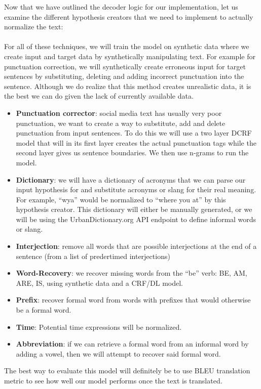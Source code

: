 \documentclass{article}
\begin{document}
Now that we have outlined the decoder logic for our implementation, let us examine the different hypothesis creators that we need to implement to actually normalize the text: \\\\
For all of these techniques, we will train the model on synthetic data where we create input and target data by synthetically manipulating text. For example for punctuation correction, we will synthetically create erroneous input for target sentences by substituting, deleting and adding incorrect punctuation into the sentence. Although we do realize that this method creates unrealistic data, it is the best we can do given the lack of currently available data.
\begin{itemize}
	\item \textbf{Punctuation corrector}: social media text has usually very poor punctuation, we want to create a way to substitute, add and delete punctuation from input sentences. To do this we will use a two layer DCRF model that will in its first layer creates the actual punctuation tags while the second layer gives us sentence boundaries. We then use n-grams to run the model.
	\item \textbf{Dictionary}: we will have a dictionary of acronyms that we can parse our input hypothesis for and substitute acronyms or slang for their real meaning. For example, “wya” would be normalized to “where you at” by this hypothesis creator. This dictionary will either be manually generated, or we will be using the UrbanDictionary.org API endpoint to define informal words or slang.
	\item \textbf{Interjection}: remove all words that are possible interjections at the end of a sentence (from a  list of predertimed interjections)
	\item \textbf{Word-Recovery}: we recover missing words from the “be” verb: BE, AM, ARE, IS, using synthetic data and a CRF/DL model.
	\item \textbf{Prefix}: recover formal word from words with prefixes that would otherwise be a formal word.
	\item \textbf{Time}: Potential time expressions will be normalized.
	\item \textbf{Abbreviation}: if we can retrieve a formal word from an informal word by adding a vowel, then we will attempt to recover said formal word.
\end{itemize}

The best way to evaluate this model will definitely be to use BLEU translation metric to see how well our model performs once the text is translated.
\end{document}
